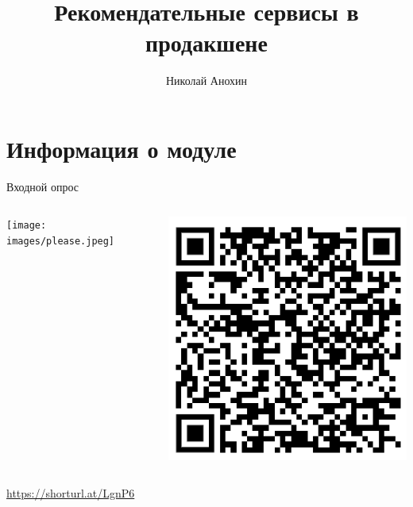 \documentclass[11pt,aspectratio=169,handout]{beamer}
\author{Николай Анохин}
\title{Рекомендательные сервисы в продакшене}
\begin{document}
{

\begin{frame}
\titlepage
\end{frame}


}

\section{Информация о модуле}

\begin{frame}{Входной опрос}

\begin{columns}

\begin{column}{0.45\textwidth}
   \begin{center}
   \texttt{[image: images/please.jpeg]}
   \end{center}
\end{column}

\begin{column}{0.45\textwidth}
  \begin{center}
  \includegraphics[scale=0.5]{images/survey.png}
  \end{center}
\end{column}

\end{columns}

\begin{center}
\url{https://shorturl.at/LgnP6}
\end{center}

\end{frame}
\end{document}
